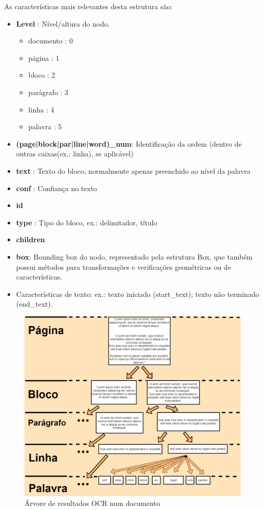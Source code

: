 As características mais relevantes desta estrutura são:

\begin{itemize}\setlength\itemsep{-0.3em}
	\item \textbf{Level} : Nível/altura do nodo.
	\begin{itemize}\setlength\itemsep{-0.3em}
		\vspace{-0.5em}
		\item documento : 0
		\item página 	: 1
		\item bloco		: 2
		\item parágrafo : 3
		\item linha 	: 4
		\item palavra	: 5
	\end{itemize}\setlength\itemsep{-0.3em}
	\item \textbf{(page|block|par|line|word)\_num}: Identificação da ordem (dentro de outras caixas(ex.: linha), se aplicável)
	\item \textbf{text} : Texto do bloco, normalmente apenas preenchido ao nível da palavra
	\item \textbf{conf} : Confiança no texto
	\item \textbf{id}
	\item \textbf{type} : Tipo do bloco, ex.: delimitador, título
	\item \textbf{children}
	\item \textbf{box}: Bounding box do nodo, representado pela estrutura Box, que também possui métodos para transformações e verificações geométricas ou de características.
	\item Características de texto: ex.: texto iniciado (start\_text); texto não terminado (end\_text).
\end{itemize}


\begin{figure}[H]
	\centering
	\includegraphics[width=1\textwidth]{images/ilustracoes/OCR_Tree_text_levels.png}
	\caption{Árvore de resultados OCR num documento}
	\label{fig:ocr_tree_document_example}
\end{figure}


